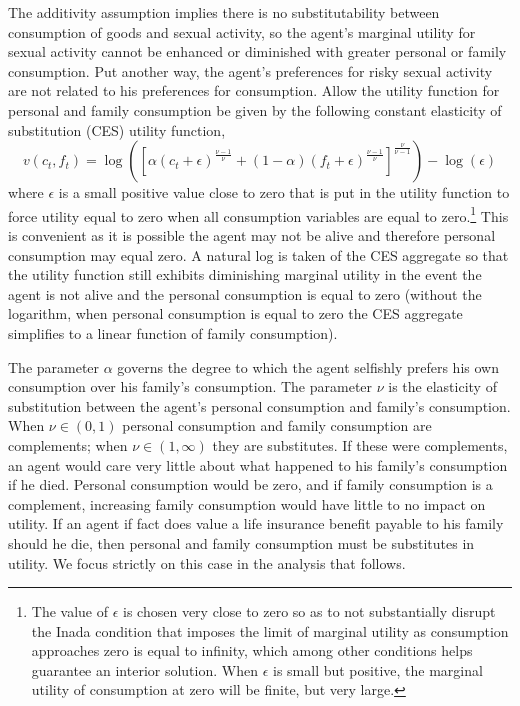 \documentclass[12pt]{article}
\newcommand{\beq}{\begin{equation}}
\newcommand{\eeq}{\end{equation}}
\begin{document}
The additivity assumption implies there is no substitutability between consumption of goods and sexual activity, so the agent's marginal utility for sexual activity cannot be enhanced or diminished with greater personal or family consumption.  Put another way, the agent's preferences for risky sexual activity are not related to his preferences for consumption.  Allow the utility function for personal and family consumption be given by the following constant elasticity of substitution (CES) utility function,
\beq \label{eq:utilcon} v(c_t, f_t) = \log\left( \left[\alpha \left(c_t + \epsilon\right)^{\frac{\nu-1}{\nu}} + (1-\alpha) \left(f_t + \epsilon \right)^{\frac{\nu-1}{\nu}} \right]^{\frac{\nu}{\nu-1}} \right) - \log(\epsilon) \eeq
where $\epsilon$ is a small positive value close to zero that is put in the utility function to force utility equal to zero when all consumption variables are equal to zero.\footnote{The value of $\epsilon$ is chosen very close to zero so as to not substantially disrupt the Inada condition that imposes the limit of marginal utility as consumption approaches zero is equal to infinity, which among other conditions helps guarantee an interior solution.  When $\epsilon$ is small but positive, the marginal utility of consumption at zero will be finite, but very large.}  This is convenient as it is possible the agent may not be alive and therefore personal consumption may equal zero.  A natural log is taken of the CES aggregate so that the utility function still exhibits diminishing marginal utility in the event the agent is not alive and the personal consumption is equal to zero (without the logarithm, when personal consumption is equal to zero the CES aggregate simplifies to a linear function of family consumption).

The parameter $\alpha$ governs the degree to which the agent selfishly prefers his own consumption over his family's consumption.  The parameter $\nu$ is the elasticity of substitution between the agent's personal consumption and family's consumption.  When $\nu\in(0,1)$ personal consumption and family consumption are complements; when $\nu\in(1,\infty)$ they are substitutes.  If these were complements, an agent would care very little about what happened to his family's consumption if he died.  Personal consumption would be zero, and if family consumption is a complement, increasing family consumption would have little to no impact on utility.  If an agent if fact does value a life insurance benefit payable to his family should he die, then personal and family consumption must be substitutes in utility.  We focus strictly on this case in the analysis that follows.
\end{document}
